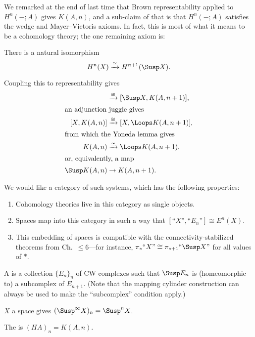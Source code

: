 We remarked at the end of last time that Brown representability applied to $H^n(-; A)$ gives $K(A, n)$, and a sub-claim of that is that $H^n(-; A)$ satisfies the wedge and Mayer--Vietoris axioms.  In fact, this is most of what it means to be a cohomology theory; the one remaining axiom is:

\begin{definition}
There is a natural isomorphism \[H^n(X) \xrightarrow\cong H^{n+1}(\Susp X).\]
\end{definition}

Coupling this to representability gives
\begin{align*}
[X, K(A, n)] & \xrightarrow\cong [\Susp X, K(A, n+1)], \\
\intertext{an adjunction juggle gives}
[X, K(A, n)] & \xrightarrow\cong [X, \Loops K(A, n+1)], \\
\intertext{from which the Yoneda lemma gives}
K(A, n) & \xrightarrow\simeq \Loops K(A, n+1), \\
\intertext{or, equivalently, a map}
\Susp K(A, n) & \to K(A, n+1).
\end{align*}

We would like a category of such systems, which has the following properties:
\begin{enumerate}
    \item Cohomology theories live in this category as single objects.
    \item Spaces map into this category in such a way that $[\text{``}X\text{''}, \text{``}E_n\text{''}] \cong E^n(X)$.
    \item This embedding of spaces is compatible with the connectivity-stabilized theorems from Ch.\ $\le$6---for instance, $\pi_* \text{``}X\text{''} \cong \pi_{*+1} \text{``}\Susp X\text{''}$ for all values of $*$.
\end{enumerate}

\begin{definition}
A  is a collection $\{E_n\}_n$ of CW complexes such that $\Susp E_n$ is (homeomorphic to) a subcomplex of $E_{n+1}$.  (Note that the mapping cylinder construction can always be used to make the ``subcomplex'' condition apply.)
\end{definition}

\begin{example}
$X$ a space gives $(\Susp^\infty X)_n = \Susp^n X$.
\end{example}

\begin{example}
The  is $(HA)_n = K(A, n)$.
\end{example}


